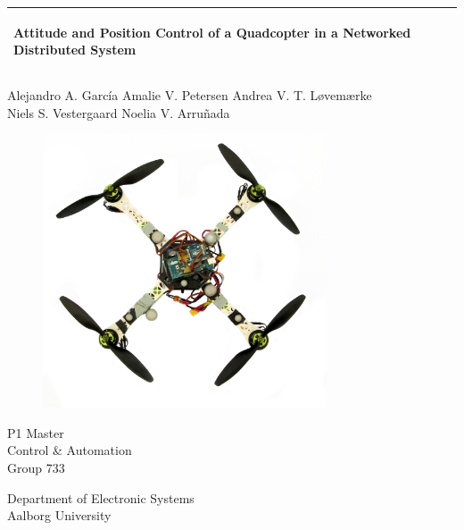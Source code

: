 %
\begin{titlepage}
  \addtolength{\hoffset}{0.5\evensidemargin-0.5\oddsidemargin} %
  \noindent%
  \begin{tabular}{@{}p{\textwidth}@{}}
    \toprule[2pt]
    \midrule
    \vspace{0.2cm}
    \begin{center}
    \Huge{\textbf{
      Attitude and Position Control of a Quadcopter in a Networked Distributed System}}
    \end{center}
	\vspace{0.19cm} \\
    \midrule
    \toprule[2pt]
  \end{tabular}
   \centering
  {
 Alejandro A. García \hspace{0.6 cm} Amalie V. Petersen \hspace{0.6 cm} Andrea V. T. Løvemærke\\

 Niels S. Vestergaard \hspace{0.6 cm}Noelia V. Arruñada}
  \vspace{0 cm}
  \begin{figure}[!ht]
\centering
\includegraphics[width=0.75\textwidth]{figures/quadcopter}
\label{fig:forside}
\end{figure}
  \vspace{-1 cm}
  \begin{center}
    {\large 
    P1 Master\\
      Control \& Automation\\
      Group 733 %
    }
  \end{center}
  
  \begin{center}
  Department of Electronic Systems\\
  Aalborg University
  \end{center}
\end{titlepage}
\clearpage